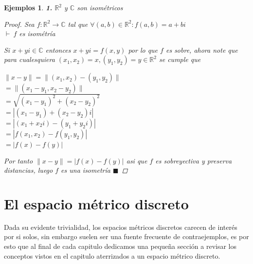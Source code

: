 \documentclass[oneside]{book} %
\theoremstyle{Teorema}
\theoremstyle{Ejemplos}
\newtheorem{Ejemplos}[Definicion]{Ejemplos}
\theoremstyle{[Obs]}
\newcommand{\abs}[1]{\left|#1\right|} %
\newcommand{\norm}[1]{\lVert#1\rVert} %
\renewcommand{\{}{\left\lbrace} %
\renewcommand{\}}{\right\rbrace} %
\newcommand{\C}{\mathbb{C}} %
\newcommand{\Ri}[1]{\mathbb{R}^{#1}} %
\renewcommand{\qed}{$\blacksquare$} %
\newcommand{\pd}{$\vdash\ $} %
\begin{document}
			\begin{Ejemplos}\setlength{\parindent}{0em}

				\textbf{1.} $\Ri{2}$ y $\C$ son isométricos

				\begin{proof}
					
					Sea $f : \Ri{2} \to \C$ tal que $\forall (a, b) \in \Ri{2} : f(a, b) = a + bi$ \\
					\pd $f$ es isométría 

					Si $x + yi \in \C$ entonces $x + yi = f(x, y)$ por lo que $f$ es sobre, ahora note que para cualesquiera $(x_1, x_2) = x, (y_1, y_2) = y \in \Ri{2}$ se cumple que  

					$\norm{x - y} = \norm{(x_1, x_2) - (y_1, y_2)}$ \\
					$= \norm{(x_1 - y_1, x_2 - y_2)}$ \\
					$= \sqrt{(x_1 - y_1)^2 + (x_2 - y_2)^2}$ \\
					$= \abs{(x_1 - y_1) + (x_2 - y_2)i}$ \\
					$= \abs{(x_1 + x_2i) - (y_1 + y_2i)}$ \\
					$= \abs{f(x_1, x_2) - f(y_1, y_2)}$ \\
					$= \abs{f(x) - f(y)}$

					Por tanto $\norm{x - y} = \abs{f(x) - f(y)}$ asi que $f$ es sobreyectiva y preserva distancias, luego $f$ es una isometría \qed
 
				\end{proof}

			\end{Ejemplos}

		\section{El espacio métrico discreto}

			\noindent Dada su evidente trivialidad, los espacios métricos discretos carecen de interés por si solos, sin embargo suelen ser una fuente frecuente de contraejemplos, es por esto que al final de cada capitulo dedicamos una pequeña sección a revisar los conceptos vistos en el capitulo aterrizados a un espacio métrico discreto.
\end{document}

